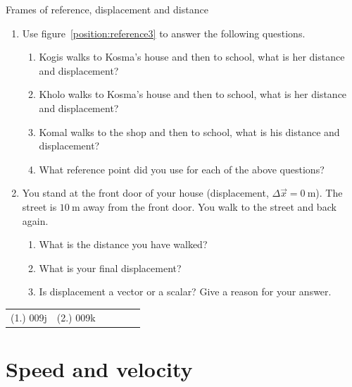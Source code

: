 \begin{exercises}{Frames of reference, displacement and distance}
            \nopagebreak \noindent
        \label{m38788*id64042}\begin{enumerate}[noitemsep, label=\textbf{\arabic*}. ] 
            \label{m38788*uid20}\item Use figure~\ref{position:reference3}  to answer the following questions.
\label{m38788*id64060}\begin{enumerate}[noitemsep, label=\textbf{\alph*}. ] 
            \label{m38788*uid21}\item Kogis walks to Kosma's house and then to school, what is her distance and displacement?
\label{m38788*uid22}\item Kholo walks to Kosma's house and then to school, what is her distance and displacement?
\label{m38788*uid23}\item Komal walks to the shop and then to school, what is his distance and displacement?
\label{m38788*uid24}\item What reference point did you use for each of the above questions?
\end{enumerate}
                \label{m38788*uid25}\item You stand at the front door of your house (displacement, $\Delta \vec{x}=0~\text{m}$). The street is $10~\text{m}$ away from the front door. You walk to the street and back again.
\label{m38788*id64141}\begin{enumerate}[noitemsep, label=\textbf{\alph*}. ] 
            \label{m38788*uid26}\item What is the distance you have walked?
\label{m38788*uid27}\item What is your final displacement?
\label{m38788*uid28}\item Is displacement a vector or a scalar? Give a reason for your answer.
\end{enumerate}
                \end{enumerate}
  \label{m38788**end}
\par \practiceinfo
 \par \begin{tabular}[h]{cccccc}
 (1.) 009j  &  (2.) 009k  & \end{tabular}
\end{exercises}
         \section{Speed and velocity} 
    \nopagebreak

